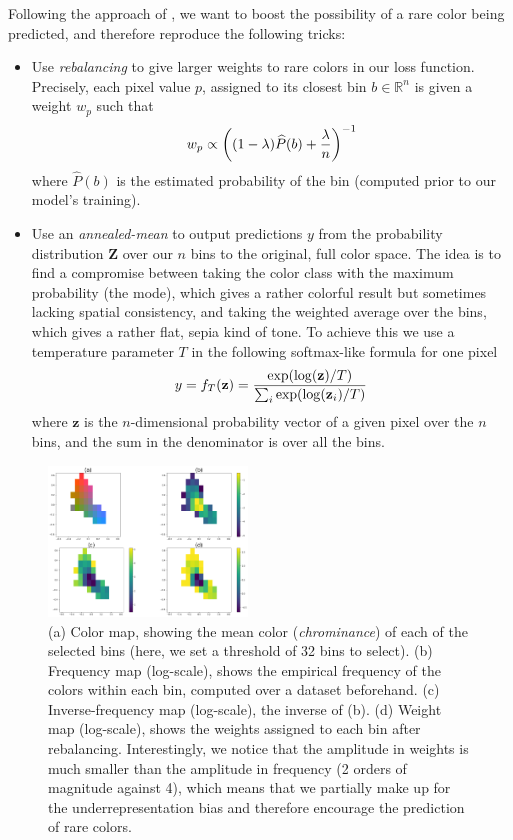 \documentclass[10pt,twocolumn,letterpaper]{article}
\begin{document}
Following the approach of \cite{zhang2016colorful}, we want to boost the possibility of a rare color being predicted, and therefore reproduce the following tricks:
\begin{itemize}
\item Use \textit{rebalancing} to give larger weights to rare colors in our loss function. Precisely, each pixel value $p$, assigned to its closest bin $b \in \mathbb{R}^n$ is given a weight $w_p$ such that $$w_p \propto \left( (1-\lambda) \widehat{P}(b) + {\lambda \over n} \right)^{-1}$$ where $\widehat{P}(b)$ is the estimated probability of the bin (computed prior to our model's training).
\item Use an \textit{annealed-mean} to output predictions $y$ from the probability distribution $\textbf{Z}$ over our $n$ bins to the original, full color space. The idea is to find a compromise between taking the color class with the maximum probability (the mode), which gives a rather colorful result but sometimes lacking spatial consistency, and taking the weighted average over the bins, which gives a rather flat, sepia kind of tone. To achieve this we use a temperature parameter $T$ in the following softmax-like formula for one pixel $$y = f_T(\textbf{z}) = {\exp(\log(\textbf{z}) / T) \over \sum_i \exp(\log(\textbf{z}_i) / T)}$$ where $\textbf{z}$ is the $n$-dimensional probability vector of a given pixel over the $n$ bins, and the sum in the denominator is over all the bins.
\end{itemize}

\begin{figure}
\begin{center}
\includegraphics[width=200px]{img/cdexample.png}
\caption{(a) Color map, showing the mean color (\textit{chrominance}) of each of the selected bins (here, we set a threshold of 32 bins to select). (b) Frequency map (log-scale), shows the empirical frequency of the colors within each bin, computed over a dataset beforehand. (c) Inverse-frequency map (log-scale), \ie the inverse of (b). (d) Weight map (log-scale), shows the weights assigned to each bin after rebalancing. Interestingly, we notice that the amplitude in weights is much smaller than the amplitude in frequency (2 orders of magnitude against 4), which means that we partially make up for the underrepresentation bias and therefore encourage the prediction of rare colors.}
\label{cdex}
\end{center}
\end{figure}
\end{document}
